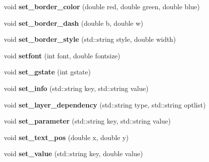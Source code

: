 \begin{DoxyCompactItemize}
\item 
\hypertarget{classPDFlib_ae32d8f048a4bcc36c4440e844685d83e}{void {\bfseries set\-\_\-border\-\_\-color} (double red, double green, double blue)}\label{classPDFlib_ae32d8f048a4bcc36c4440e844685d83e}

\item 
\hypertarget{classPDFlib_aaf02e71f9941ea7f615579cbd70b1d75}{void {\bfseries set\-\_\-border\-\_\-dash} (double b, double w)}\label{classPDFlib_aaf02e71f9941ea7f615579cbd70b1d75}

\item 
\hypertarget{classPDFlib_a0353836b9d1e47007aea5eb9573e4abf}{void {\bfseries set\-\_\-border\-\_\-style} (std\-::string style, double width)}\label{classPDFlib_a0353836b9d1e47007aea5eb9573e4abf}

\item 
\hypertarget{classPDFlib_a3454c94557adb7486abbad059bbe98f2}{void {\bfseries setfont} (int font, double fontsize)}\label{classPDFlib_a3454c94557adb7486abbad059bbe98f2}

\item 
\hypertarget{classPDFlib_ac40b1d868fb9430800c46667f49e16ff}{void {\bfseries set\-\_\-gstate} (int gstate)}\label{classPDFlib_ac40b1d868fb9430800c46667f49e16ff}

\item 
\hypertarget{classPDFlib_a1679bc2cdc767964fe19993032704c65}{void {\bfseries set\-\_\-info} (std\-::string key, std\-::string value)}\label{classPDFlib_a1679bc2cdc767964fe19993032704c65}

\item 
\hypertarget{classPDFlib_a3bf3c45ea844c50c81d1e6d1a399f7cf}{void {\bfseries set\-\_\-layer\-\_\-dependency} (std\-::string type, std\-::string optlist)}\label{classPDFlib_a3bf3c45ea844c50c81d1e6d1a399f7cf}

\item 
\hypertarget{classPDFlib_abced8a3b9223a00e6a9fbf13aa2cf488}{void {\bfseries set\-\_\-parameter} (std\-::string key, std\-::string value)}\label{classPDFlib_abced8a3b9223a00e6a9fbf13aa2cf488}

\item 
\hypertarget{classPDFlib_a68aaa2b104cbeff66f28478c5503b71c}{void {\bfseries set\-\_\-text\-\_\-pos} (double x, double y)}\label{classPDFlib_a68aaa2b104cbeff66f28478c5503b71c}

\item 
\hypertarget{classPDFlib_a5fbc3e6d8843291ada8fabe40a106caf}{void {\bfseries set\-\_\-value} (std\-::string key, double value)}\label{classPDFlib_a5fbc3e6d8843291ada8fabe40a106caf}


\end{DoxyCompactItemize}

